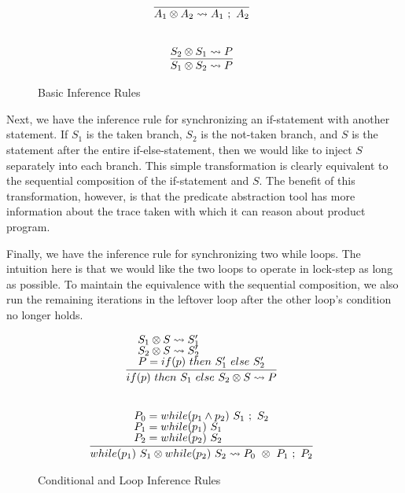 \documentclass[letterpaper,twocolumn,10pt]{article}
\newcommand{\cross}{\otimes{}}
\begin{document}
\begin{figure}
    \label{fig:infrules1}
    \caption{Basic Inference Rules}
    \[
		\begin{array}{c}
			\infer[]{A_1 \cross A_2 \leadsto A_1\ ;\ A_2}{} \\ \\ \\
			\infer[]{S_1 \cross S_2 \leadsto P}{
				S_2 \cross S_1 \leadsto P
			}
        \end{array}
    \]
\end{figure}

Next, we have the inference rule for synchronizing an if-statement with another statement. If $S_1$ is the taken branch, $S_2$ is the not-taken branch, and $S$ is the statement after the entire if-else-statement, then we would like to inject $S$ separately into each branch. This simple transformation is clearly equivalent to the sequential composition of the if-statement and $S$. The benefit of this transformation, however, is that the predicate abstraction tool has more information about the trace taken with which it can reason about product program. 

Finally, we have the inference rule for synchronizing two while loops. The intuition here is that we would like the two loops to operate in lock-step as long as possible. To maintain the equivalence with the sequential composition, we also run the remaining iterations in the leftover loop after the other loop's condition no longer holds.

\begin{figure}
    \label{fig:infrules2}
    \caption{Conditional and Loop Inference Rules}
    \[
		\begin{array}{c}
			\infer[]{if(p)\ then\ S_1\ else\ S_2 \cross S \leadsto P}{
				\text{$S_1 \cross S \leadsto S_1'$} \\
				\text{$S_2 \cross S \leadsto S_2'$} \\
				\text{$P = if(p)\ then\ S_1'\ else\ S_2'$}
			} \\ \\ \\
			\infer[]{while(p_1)\ S_1 \cross while(p_2)\ S_2 \leadsto P_0\ \cross\ P_1\ ;\ P_2}{
				\text{$P_0 = while(p_1 \land p_2)\ S_1\ ;\ S_2$} \\
				\text{$P_1 = while(p_1)\ S_1$} \\
				\text{$P_2 = while(p_2)\ S_2$}
			}
        \end{array}
    \]
\end{figure}
\end{document}
